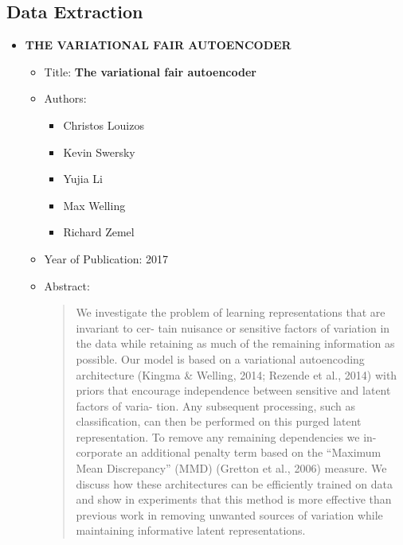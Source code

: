 \documentclass{article}
\begin{document}
    \subsection{Data Extraction}
    \begin{itemize}
        \item \textbf{THE VARIATIONAL FAIR AUTOENCODER}
        \begin{itemize}
            \item Title: \textbf{The variational fair autoencoder}
            \item Authors: 
            \begin{itemize}
                \item Christos Louizos
                \item Kevin Swersky
                \item Yujia Li
                \item Max Welling
                \item Richard Zemel
            \end{itemize}
            \item Year of Publication: 2017
            \item Abstract:
            \begin{abstract}
                We investigate the problem of learning representations that are invariant to cer-
                tain nuisance or sensitive factors of variation in the data while retaining as much
                of the remaining information as possible. Our model is based on a variational
                autoencoding architecture (Kingma & Welling, 2014; Rezende et al., 2014) with
                priors that encourage independence between sensitive and latent factors of varia-
                tion. Any subsequent processing, such as classification, can then be performed on
                this purged latent representation. To remove any remaining dependencies we in-
                corporate an additional penalty term based on the “Maximum Mean Discrepancy”
                (MMD) (Gretton et al., 2006) measure. We discuss how these architectures can
                be efficiently trained on data and show in experiments that this method is more
                effective than previous work in removing unwanted sources of variation while
                maintaining informative latent representations.
            \end{abstract}
        \end{itemize}
        

\end{itemize}
\end{document}
